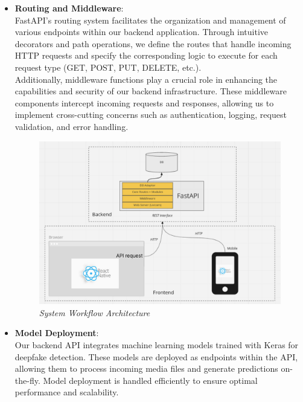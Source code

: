 \begin{itemize}
    \item \textbf{Routing and Middleware}:\\
          FastAPI's routing system facilitates the organization and management of various endpoints within our backend application. Through intuitive decorators and path operations, we define the routes that handle incoming HTTP requests and specify the corresponding logic to execute for each request type (GET, POST, PUT, DELETE, etc.).\\

          Additionally, middleware functions play a crucial role in enhancing the capabilities and security of our backend infrastructure. These middleware components intercept incoming requests and responses, allowing us to implement cross-cutting concerns such as authentication, logging, request validation, and error handling.\\

          \begin{figure}[htbp]
              \centering
              \includegraphics[width=6in]{img/Frontend_Backend.png}
              \caption{\textit{System Workflow Architecture}}
          \end{figure}

    \item \textbf{Model Deployment}:\\
          Our backend API integrates machine learning models trained with Keras for deepfake detection. These models are deployed as endpoints within the API, allowing them to process incoming media files and generate predictions on-the-fly. Model deployment is handled efficiently to ensure optimal performance and scalability.\\

\end{itemize}


\newpage